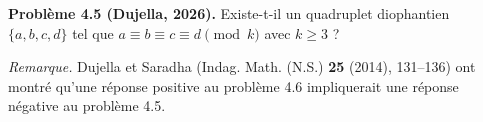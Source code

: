 \textbf{Problème 4.5 (Dujella, 2026).} Existe-t-il un quadruplet diophantien $\{a,b,c,d\}$ tel que $a \equiv b \equiv c \equiv d \pmod{k}$ avec $k \geqslant 3$ ?

\medskip

\textit{Remarque.} Dujella et Saradha (Indag. Math. (N.S.) \textbf{25} (2014), 131--136) ont montré qu'une réponse positive au problème 4.6 impliquerait une réponse négative au problème 4.5.
